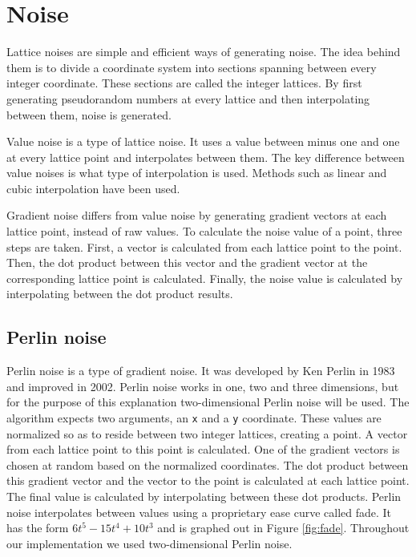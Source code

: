 \section{Noise}
Lattice noises are simple and efficient ways of generating noise\cite{TexturingModeling}. The idea behind them is to divide a coordinate system into sections spanning between every integer coordinate. These sections are called the integer lattices. By first generating pseudorandom numbers at every lattice and then interpolating between them, noise is generated.
		
\par
Value noise is a type of lattice noise. It uses a value between minus one and one at every lattice point and interpolates between them. The key difference between value noises is what type of interpolation is used. Methods such as linear and cubic interpolation have been used\cite{TexturingModeling}.
		
\par
Gradient noise differs from value noise by generating gradient vectors at each lattice point, instead of raw values. To calculate the noise value of a point, three steps are taken. First, a vector is calculated from each lattice point to the point.  Then, the dot product between this vector and the gradient vector at the corresponding lattice point is calculated. Finally, the noise value is calculated by interpolating between the dot product results.
		
\subsection{Perlin noise}
Perlin noise is a type of gradient noise. It was developed by Ken Perlin in 1983 and improved in 2002\cite{PerlinNoise}. Perlin noise works in one, two and three dimensions, but for the purpose of this explanation two-dimensional Perlin noise will be used. The algorithm expects two arguments, an \texttt{x} and a \texttt{y} coordinate. These values are normalized so as to reside between two integer lattices, creating a point. A vector from each lattice point to this point is calculated. One of the gradient vectors is chosen at random based on the normalized coordinates. The dot product between this gradient vector and the vector to the point is calculated at each lattice point. The final value is calculated by interpolating between these dot products. Perlin noise interpolates between values using a proprietary ease curve called fade. It has the form \begin{math}6t^5-15t^4+10t^3\end{math} and is graphed out in Figure \ref{fig:fade}. Throughout our implementation we used two-dimensional Perlin noise.
		
